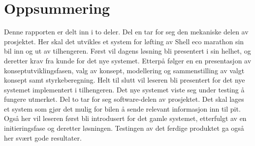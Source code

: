 \section*{\centering Oppsummering}
Denne rapporten er delt inn i to deler.\newline
Del en tar for seg den mekaniske delen av prosjektet. Her skal det utvikles et system for løfting av Shell eco marathon sin bil inn og ut av tilhengeren. Først vil dagens løsning bli presentert i sin helhet, og deretter krav fra kunde for det nye systemet. Etterpå følger en en presentasjon av konseptutviklingsfasen, valg av konsept, modellering og sammenstilling av valgt konsept samt styrkeberegning. Helt til slutt vil leseren bli presentert for det nye systemet implementert i tilhengeren. Det nye systemet viste seg under testing å fungere utmerket.
Del to tar for seg software-delen av prosjektet. Det skal lages et system som gjør det mulig for bilen å sende relevant informasjon inn til pit. Også her vil leseren først bli introdusert for det gamle systemet, etterfulgt av en initieringsfase og deretter løsningen. Testingen av det ferdige produktet ga også her svært gode resultater.
